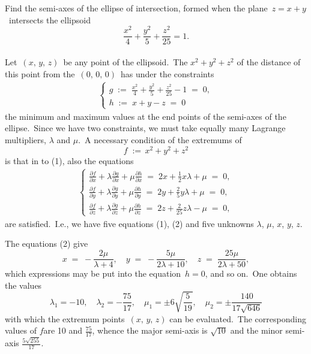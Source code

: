 \documentclass[12pt]{article}
\theoremstyle{definition}
\begin{document}
Find the semi-axes of the ellipse of intersection, formed when the plane \,$z = x\!+\!y$\, intersects the ellipsoid 
$$\frac{x^2}{4}+\frac{y^2}{5}+\frac{z^2}{25} = 1.$$\\

Let \,$(x,\,y,\,z)$\, be any point of the ellipsoid.\, The  $x^2\!+\!y^2\!+\!z^2$ of the distance of this point from the  \,$(0,\,0,\,0)$\, has under the constraints
\begin{align}
\begin{cases}
g \;:=\; \frac{x^2}{4}+\frac{y^2}{5}+\frac{z^2}{25}-1 \;=\;0,\\
h \;:=\; x+y-z \;=\; 0
\end{cases}
\end{align}
the minimum and maximum values at the end points of the semi-axes of the ellipse.\, Since we have two constraints, we must take equally many Lagrange multipliers, $\lambda$ and $\mu$.\, A necessary condition of the extremums of
$$f \;:=\, x^2\!+\!y^2\!+\!z^2$$
is that in  to (1), also the equations
\begin{align}
\begin{cases}
\frac{\partial f}{\partial x}+\lambda\frac{\partial g}{\partial x}+\mu\frac{\partial h}{\partial x}
\;=\; 2x+\frac{1}{2}x\lambda+\mu \;=\; 0,\\
\frac{\partial f}{\partial y}+\lambda\frac{\partial g}{\partial y}+\mu\frac{\partial h}{\partial y}
\;=\; 2y+\frac{2}{5}y\lambda+\mu \;=\; 0,\\
\frac{\partial f}{\partial z}+\lambda\frac{\partial g}{\partial z}+\mu\frac{\partial h}{\partial z}
\;=\; 2z+\frac{2}{25}z\lambda-\mu \;=\; 0,
\end{cases}
\end{align}
are satisfied.\, I.e., we have five equations (1), (2) and five unknowns $\lambda$, $\mu$, $x$, $y$, $z$.

The equations (2) give
$$x \;=\; -\frac{2\mu}{\lambda\!+\!4}, \quad y \;=\; -\frac{5\mu}{2\lambda\!+\!10}, 
\quad z \;=\; \frac{25\mu}{2\lambda\!+\!50},$$
which expressions may be put into the equation\, $h = 0$, and so on.\, One obtains the values 
$$\lambda_1 = -10, \quad \lambda_2 = -\frac{75}{17}, \quad \mu_1 = \pm6\sqrt{\frac{5}{19}}, 
\quad \mu_2 = \pm\frac{140}{17\sqrt{646}}$$
with which the extremum points \,$(x,\,y,\,z)$ can be evaluated.\, The corresponding values of $f$are 10 and $\frac{75}{17}$, whence the major semi-axis is $\sqrt{10}$ and the minor semi-axis $\frac{5\sqrt{255}}{17}$.

\end{document}
